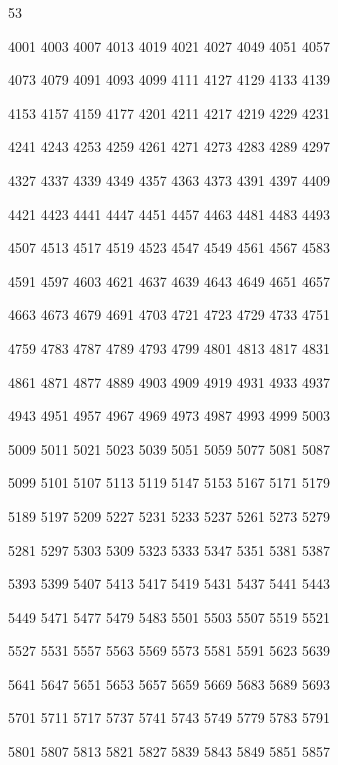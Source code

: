 \documentclass{article}
\begin{document}

53

4001   4003   4007   4013   4019   4021   4027   4049   4051   4057 

   4073   4079   4091   4093   4099   4111   4127   4129   4133   4139 

   4153   4157   4159   4177   4201   4211   4217   4219   4229   4231 

   4241   4243   4253   4259   4261   4271   4273   4283   4289   4297 

   4327   4337   4339   4349   4357   4363   4373   4391   4397   4409 

   4421   4423   4441   4447   4451   4457   4463   4481   4483   4493 

   4507   4513   4517   4519   4523   4547   4549   4561   4567   4583 

   4591   4597   4603   4621   4637   4639   4643   4649   4651   4657 

   4663   4673   4679   4691   4703   4721   4723   4729   4733   4751 

   4759   4783   4787   4789   4793   4799   4801   4813   4817   4831 

   4861   4871   4877   4889   4903   4909   4919   4931   4933   4937 

   4943   4951   4957   4967   4969   4973   4987   4993   4999   5003 

   5009   5011   5021   5023   5039   5051   5059   5077   5081   5087 

   5099   5101   5107   5113   5119   5147   5153   5167   5171   5179 

   5189   5197   5209   5227   5231   5233   5237   5261   5273   5279 

   5281   5297   5303   5309   5323   5333   5347   5351   5381   5387 

   5393   5399   5407   5413   5417   5419   5431   5437   5441   5443 

   5449   5471   5477   5479   5483   5501   5503   5507   5519   5521 

   5527   5531   5557   5563   5569   5573   5581   5591   5623   5639 

   5641   5647   5651   5653   5657   5659   5669   5683   5689   5693 

   5701   5711   5717   5737   5741   5743   5749   5779   5783   5791 

   5801   5807   5813   5821   5827   5839   5843   5849   5851   5857
\end{document}
